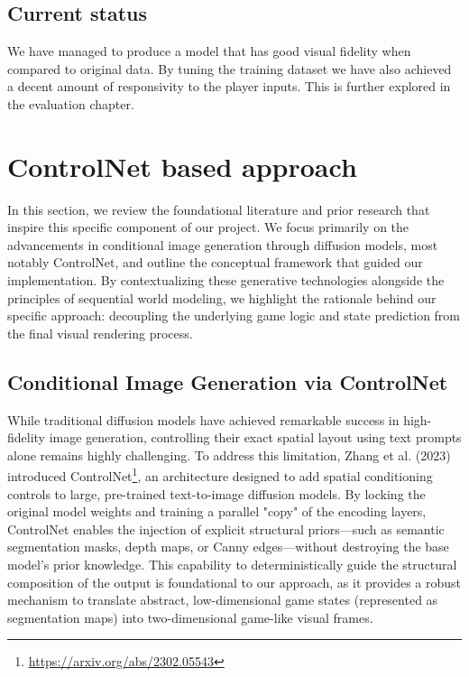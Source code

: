 \documentclass[twocolumn,a4paper]{article}
\begin{document}
\subsection{Current status}

We have managed to produce a model that has good visual fidelity when compared to original data. By tuning the training dataset we have also achieved a decent amount of responsivity to the player inputs. This is further explored in the evaluation chapter.


\section{ControlNet based approach}
\label{controlnet}

In this section, we review the foundational literature and prior research that inspire this specific component of our project. We focus primarily on the advancements in conditional image generation through diffusion models, most notably ControlNet, and outline the conceptual framework that guided our implementation. By contextualizing these generative technologies alongside the principles of sequential world modeling, we highlight the rationale behind our specific approach: decoupling the underlying game logic and state prediction from the final visual rendering process.



\subsection{Conditional Image Generation via ControlNet}

While traditional diffusion models have achieved remarkable success in high-fidelity image generation, controlling their exact spatial layout using text prompts alone remains highly challenging. To address this limitation, Zhang et al. (2023) introduced ControlNet\footnote{\url{https://arxiv.org/abs/2302.05543}}, an architecture designed to add spatial conditioning controls to large, pre-trained text-to-image diffusion models. By locking the original model weights and training a parallel "copy" of the encoding layers, ControlNet enables the injection of explicit structural priors—such as semantic segmentation masks, depth maps, or Canny edges—without destroying the base model's prior knowledge.  This capability to deterministically guide the structural composition of the output is foundational to our approach, as it provides a robust mechanism to translate abstract, low-dimensional game states (represented as segmentation maps) into two-dimensional game-like visual frames.
\end{document}
